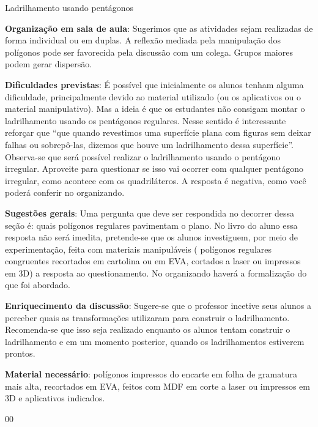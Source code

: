 \begin{sugestions}{Ladrilhamento usando pentágonos}
{
\textbf{Organização em sala de aula}: Sugerimos que as atividades sejam realizadas de forma individual ou em duplas. A reflexão mediada pela manipulação dos polígonos pode ser favorecida pela discussão com um colega. Grupos maiores podem gerar dispersão.

\textbf{Dificuldades previstas}: É possível que inicialmente os alunos tenham alguma dificuldade, principalmente devido ao material utilizado (ou os aplicativos ou o material manipulativo). Mas a ideia é que os estudantes não consigam  montar o ladrilhamento usando os pentágonos regulares. Nesse sentido é interessante reforçar que “que quando revestimos uma superfície plana com figuras sem deixar falhas ou sobrepô-las, dizemos que houve um ladrilhamento dessa superfície”. Observa-se que será possível realizar o ladrilhamento usando o pentágono irregular. Aproveite para questionar se isso vai ocorrer com qualquer pentágono irregular, como acontece com os quadriláteros. A resposta é negativa, como você poderá conferir no organizando. 

\textbf{Sugestões gerais}: Uma pergunta que deve ser respondida no decorrer dessa seção é: quais polígonos regulares pavimentam o plano. No livro do aluno essa resposta não será imedita, pretende-se que os alunos investiguem, por meio de experimentação, feita com materiais manipuláveis ( polígonos regulares congruentes recortados em cartolina ou em EVA, cortados a laser ou impressos em 3D) a resposta ao questionamento. No organizando haverá a formalização do que foi abordado.  

\textbf{Enriquecimento da discussão}: Sugere-se que o professor incetive seus alunos a perceber quais as transformações utilizaram para construir o ladrilhamento. Recomenda-se que isso seja realizado enquanto os alunos tentam construir o ladrilhamento e em um momento posterior, quando os ladrilhamentos estiverem prontos.

\textbf{Material necessário}: polígonos impressos do encarte em folha de gramatura mais alta, recortados em EVA, feitos com MDF em corte a laser ou impressos em 3D e aplicativos indicados.
}{0}{0}
\end{sugestions}
\marginpar{\vspace{.5\baselineskip}}
